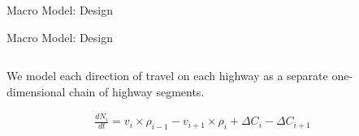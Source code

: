 \begin{frame}{Macro Model: Design}

\end{frame}

\begin{frame}{Macro Model: Design}
\begin{columns}
\begin{column}{0.5\textwidth}
We model each direction of travel on each highway as a separate one-dimensional chain of highway segments.

\begin{align*}
\frac{dN_i}{dt} = v_{i} \times \rho_{i-1} - v_{i+1} \times \rho_{i} + \Delta C_i - \Delta C_{i + 1}
\end{align*}



\end{column}

\begin{column}{0.5\textwidth}

\end{column}
\end{columns}
\end{frame}
